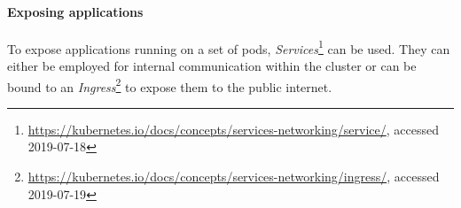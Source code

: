 \paragraph{Exposing applications}

To expose applications running on a set of pods, \textit{Services}\footnote{\url{https://kubernetes.io/docs/concepts/services-networking/service/}, accessed 2019-07-18} can be used. They can either be employed for internal communication within the cluster or can be bound to an \textit{Ingress}\footnote{\url{https://kubernetes.io/docs/concepts/services-networking/ingress/}, accessed 2019-07-19} to expose them to the public internet. 

